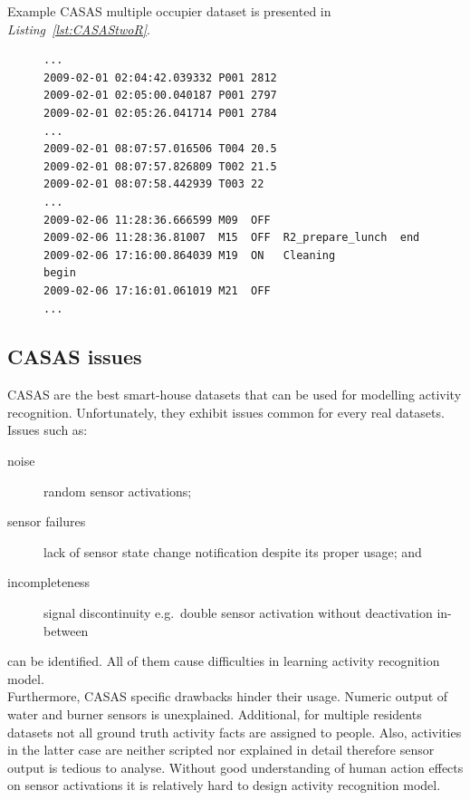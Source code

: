 \documentclass[12pt, a4paper, pdflatex, leqno, twoside, openright]{report}
\begin{document}
Example CASAS multiple occupier dataset is presented in \emph{Listing~\ref{lst:CASAStwoR}}.
\begin{figure}[htb]
  \begin{lstlisting}
...
2009-02-01 02:04:42.039332 P001 2812
2009-02-01 02:05:00.040187 P001 2797
2009-02-01 02:05:26.041714 P001 2784
...
2009-02-01 08:07:57.016506 T004 20.5
2009-02-01 08:07:57.826809 T002 21.5
2009-02-01 08:07:58.442939 T003 22
...
2009-02-06 11:28:36.666599 M09  OFF
2009-02-06 11:28:36.81007  M15  OFF  R2_prepare_lunch  end
2009-02-06 17:16:00.864039 M19  ON   Cleaning          begin
2009-02-06 17:16:01.061019 M21  OFF
...
  \end{lstlisting}
\end{figure}

    \subsection{CASAS issues\label{sec:dataIssues}}
CASAS are the best smart-house datasets that can be used for modelling activity recognition. Unfortunately, they exhibit issues common for every real datasets. Issues such as:
\begin{description}
\item[noise] random sensor activations;
\item[sensor failures] lack of sensor state change notification despite its proper usage; and
\item[incompleteness] signal discontinuity e.g.\ double sensor activation without deactivation in-between
\end{description}
can be identified. All of them cause difficulties in learning activity recognition model.\\

Furthermore, CASAS specific drawbacks hinder their usage. Numeric output of water and burner sensors is unexplained. Additional, for multiple residents datasets not all ground truth activity facts are assigned to people. Also, activities in the latter case are neither scripted nor explained in detail therefore sensor output is tedious to analyse. Without good understanding of human action effects on sensor activations it is relatively hard to design activity recognition model.\\
\end{document}
